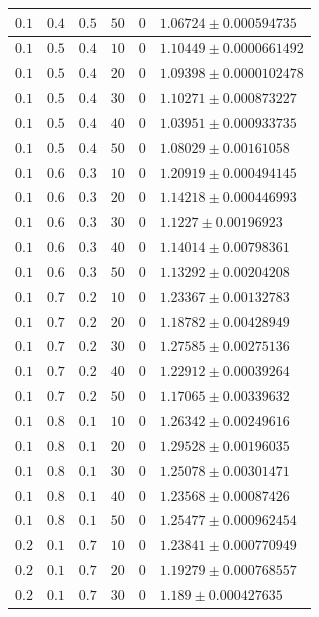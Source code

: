 \documentclass[14pt]{extreport}
\begin{document}
\begin{center}
\begin{longtable}{|p{1cm}|p{1cm}|p{1cm}|p{1cm}|p{1cm}|p{8cm}|}
$0.1$ & $0.4$ & $0.5$ & $50$ & $0$ & $1.06724 \pm 0.000594735$ \\ \hline
$0.1$ & $0.5$ & $0.4$ & $10$ & $0$ & $1.10449 \pm 0.0000661492$ \\ \hline
$0.1$ & $0.5$ & $0.4$ & $20$ & $0$ & $1.09398 \pm 0.0000102478$ \\ \hline
$0.1$ & $0.5$ & $0.4$ & $30$ & $0$ & $1.10271 \pm 0.000873227$ \\ \hline
$0.1$ & $0.5$ & $0.4$ & $40$ & $0$ & $1.03951 \pm 0.000933735$ \\ \hline
$0.1$ & $0.5$ & $0.4$ & $50$ & $0$ & $1.08029 \pm 0.00161058$ \\ \hline
$0.1$ & $0.6$ & $0.3$ & $10$ & $0$ & $1.20919 \pm 0.000494145$ \\ \hline
$0.1$ & $0.6$ & $0.3$ & $20$ & $0$ & $1.14218 \pm 0.000446993$ \\ \hline
$0.1$ & $0.6$ & $0.3$ & $30$ & $0$ & $1.1227 \pm 0.00196923$ \\ \hline
$0.1$ & $0.6$ & $0.3$ & $40$ & $0$ & $1.14014 \pm 0.00798361$ \\ \hline
$0.1$ & $0.6$ & $0.3$ & $50$ & $0$ & $1.13292 \pm 0.00204208$ \\ \hline
$0.1$ & $0.7$ & $0.2$ & $10$ & $0$ & $1.23367 \pm 0.00132783$ \\ \hline
$0.1$ & $0.7$ & $0.2$ & $20$ & $0$ & $1.18782 \pm 0.00428949$ \\ \hline
$0.1$ & $0.7$ & $0.2$ & $30$ & $0$ & $1.27585 \pm 0.00275136$ \\ \hline
$0.1$ & $0.7$ & $0.2$ & $40$ & $0$ & $1.22912 \pm 0.00039264$ \\ \hline
$0.1$ & $0.7$ & $0.2$ & $50$ & $0$ & $1.17065 \pm 0.00339632$ \\ \hline
$0.1$ & $0.8$ & $0.1$ & $10$ & $0$ & $1.26342 \pm 0.00249616$ \\ \hline
$0.1$ & $0.8$ & $0.1$ & $20$ & $0$ & $1.29528 \pm 0.00196035$ \\ \hline
$0.1$ & $0.8$ & $0.1$ & $30$ & $0$ & $1.25078 \pm 0.00301471$ \\ \hline
$0.1$ & $0.8$ & $0.1$ & $40$ & $0$ & $1.23568 \pm 0.00087426$ \\ \hline
$0.1$ & $0.8$ & $0.1$ & $50$ & $0$ & $1.25477 \pm 0.000962454$ \\ \hline
$0.2$ & $0.1$ & $0.7$ & $10$ & $0$ & $1.23841 \pm 0.000770949$ \\ \hline
$0.2$ & $0.1$ & $0.7$ & $20$ & $0$ & $1.19279 \pm 0.000768557$ \\ \hline
$0.2$ & $0.1$ & $0.7$ & $30$ & $0$ & $1.189 \pm 0.000427635$ \\ \hline

\end{longtable}
\end{center}
\end{document}
